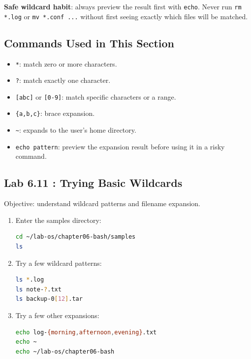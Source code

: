 \begin{tipbox}
\textbf{Safe wildcard habit}: always preview the result first with
\texttt{echo}. Never run \texttt{rm *.log} or \texttt{mv *.conf ...} without
first seeing exactly which files will be matched.
\end{tipbox}

\subsection*{Commands Used in This Section}

\begin{itemize}
  \item \texttt{*}: match zero or more characters.
  \item \texttt{?}: match exactly one character.
  \item \texttt{[abc]} or \texttt{[0-9]}: match specific characters or a range.
  \item \texttt{\{a,b,c\}}: brace expansion.
  \item \texttt{\textasciitilde}: expands to the user's home directory.
  \item \texttt{echo pattern}: preview the expansion result before using it
    in a risky command.
\end{itemize}

\subsection*{Lab 6.11 : Trying Basic Wildcards}

Objective: understand wildcard patterns and filename expansion.

\begin{enumerate}
  \item Enter the samples directory:
\begin{lstlisting}[language=bash, caption={Entering the samples directory}]
cd ~/lab-os/chapter06-bash/samples
ls
\end{lstlisting}

  \item Try a few wildcard patterns:
\begin{lstlisting}[language=bash, caption={Trying basic wildcards}]
ls *.log
ls note-?.txt
ls backup-0[12].tar
\end{lstlisting}

  \item Try a few other expansions:
\begin{lstlisting}[language=bash, caption={Trying brace and tilde expansion}]
echo log-{morning,afternoon,evening}.txt
echo ~
echo ~/lab-os/chapter06-bash
\end{lstlisting}
\end{enumerate}

